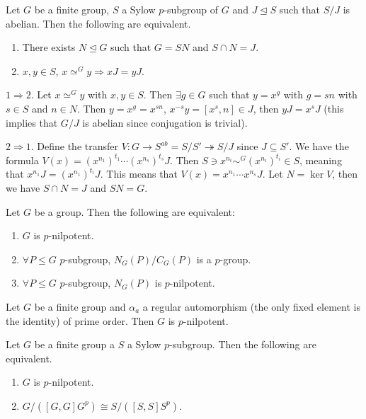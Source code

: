 \documentclass[twoside, 11pt]{article}
\begin{document}
\begin{prop}
Let $G$ be a finite group, $S$ a Sylow $p$-subgroup of $G$ and $J\trianglelefteq S$ such that $S/J$ is abelian. Then the following are equivalent.
\begin{enumerate}
\item There exists $N\trianglelefteq G$ such that $G=SN$ and $S\cap N=J$. 
\item $x,y\in S$, $x\simeq^G y\Rightarrow xJ=yJ$. 
\end{enumerate}
\end{prop}
\begin{dem}
$1\Rightarrow 2$. Let $x\simeq^G y$ with $x,y\in S$. Then $\exists g\in G$ such that $y=x^g$ with $g=sn$ with $s\in S$ and $n\in N$. Then $y=x^g=x^{sn}$, $x^{-s}y=[x^s,n]\in J$, then $yJ=x^sJ$ (this implies that $G/J$ is abelian since conjugation is trivial).

$2\Rightarrow 1$. Define the transfer $V:G\to S^{ab}=S/S'\twoheadrightarrow S/J$ since $J\subseteq S'$. We have the formula $V(x)=(x^{n_1})^{t_1}\cdots(x^{n_s})^{t_s}J$. Then $S\ni x^{n_i}\sim^G  (x^{n_i})^{t_i}\in S$, meaning that $x^{n_1}J=(x^{n_1})^{t_i}J$. This means that $V(x)=x^{n_1}\cdots x^{n_s}J$. Let $N=\ker V$, then we have $S\cap N=J$ and $SN=G$. 
\end{dem}

\begin{teorema}
Let $G$ be a group. Then the following are equivalent:
\begin{enumerate}
\item $G$ is $p$-nilpotent.
\item $\forall P\leq G$ $p$-subgroup, $N_G(P)/C_G(P)$ is a $p$-group.
\item $\forall P\leq G$ $p$-subgroup, $N_G(P)$ is $p$-nilpotent.
\end{enumerate}
\end{teorema}

\begin{teorema}[Thompson]
Let $G$ be a finite group and $\alpha_a$ a regular automorphism (the only fixed element is the identity) of prime order. Then $G$ is $p$-nilpotent.
\end{teorema}

\begin{teorema}[Tate]
Let $G$ be a finite group a $S$ a Sylow $p$-subgroup. Then the following are equivalent.
\begin{enumerate}
\item $G$ is $p$-nilpotent.
\item $G/([G,G]G^p)\cong S/([S,S]S^p)$.
\end{enumerate}
\end{teorema}
\end{document}
